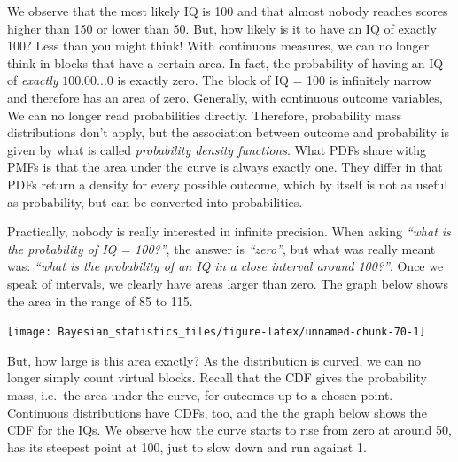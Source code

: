 \documentclass[]{svmono}
\newenvironment{Shaded}{\begin{snugshade}}{\end{snugshade}}
\newcommand{\KeywordTok}[1]{\textcolor[rgb]{0.13,0.29,0.53}{\textbf{#1}}}
\newcommand{\DataTypeTok}[1]{\textcolor[rgb]{0.13,0.29,0.53}{#1}}
\newcommand{\StringTok}[1]{\textcolor[rgb]{0.31,0.60,0.02}{#1}}
\newcommand{\OperatorTok}[1]{\textcolor[rgb]{0.81,0.36,0.00}{\textbf{#1}}}
\newcommand{\NormalTok}[1]{#1}
\begin{document}
We observe that the most likely IQ is 100 and that almost nobody reaches
scores higher than 150 or lower than 50. But, how likely is it to have
an IQ of exactly 100? Less than you might think! With continuous
measures, we can no longer think in blocks that have a certain area. In
fact, the probability of having an IQ of \emph{exactly} \(100.00...0\)
is exactly zero. The block of IQ = 100 is infinitely narrow and
therefore has an area of zero. Generally, with continuous outcome
variables, We can no longer read probabilities directly. Therefore,
probability mass distributions don't apply, but the association between
outcome and probability is given by what is called \emph{probability
density functions}. What PDFs share withg PMFs is that the area under
the curve is always exactly one. They differ in that PDFs return a
density for every possible outcome, which by itself is not as useful as
probability, but can be converted into probabilities.

Practically, nobody is really interested in infinite precision. When
asking \emph{``what is the probability of IQ = 100?''}, the answer is
\emph{``zero''}, but what was really meant was: \emph{``what is the
probability of an IQ in a close interval around 100?''}. Once we speak
of intervals, we clearly have areas larger than zero. The graph below
shows the area in the range of 85 to 115.

\begin{Shaded}
\end{Shaded}

\texttt{[image: Bayesian\_statistics\_files/figure-latex/unnamed-chunk-70-1]}

But, how large is this area exactly? As the distribution is curved, we
can no longer simply count virtual blocks. Recall that the CDF gives the
probability mass, i.e.~the area under the curve, for outcomes up to a
chosen point. Continuous distributions have CDFs, too, and the the graph
below shows the CDF for the IQs. We observe how the curve starts to rise
from zero at around 50, has its steepest point at 100, just to slow down
and run against 1.
\end{document}
